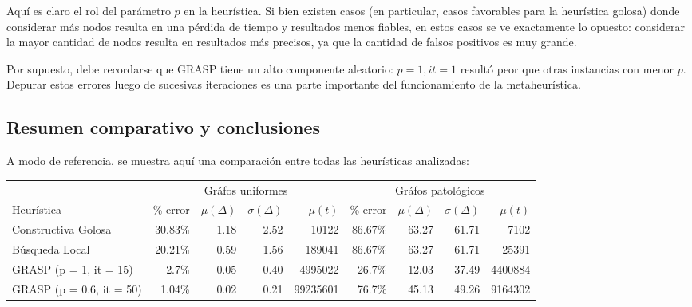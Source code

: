 Aquí es claro el rol del parámetro $p$ en la heurística. Si bien existen casos (en particular, casos favorables para la heurística golosa) donde considerar más nodos resulta en una pérdida de tiempo y resultados menos fiables, en estos casos se ve exactamente lo opuesto: considerar la mayor cantidad de nodos resulta en resultados más precisos, ya que la cantidad de falsos positivos es muy grande.

Por supuesto, debe recordarse que GRASP tiene un alto componente aleatorio: $p = 1, it = 1$ resultó peor que otras instancias con menor $p$. Depurar estos errores luego de sucesivas iteraciones es una parte importante del funcionamiento de la metaheurística.

\subsection{Resumen comparativo y conclusiones}

A modo de referencia, se muestra aquí una comparación entre todas las heurísticas analizadas:

\begin{center}
    \begin{tabular}{| l | r | r | r | r | r | r | r | r |}
        \hline
                                 & \multicolumn{4}{|c|}{Gráfos uniformes}                            & \multicolumn{4}{|c|}{Gráfos patológicos}    \\ \cline{2-9}
        Heurística               & \% error & $\mu(\Delta)$ & $\sigma(\Delta)$ & $\mu(t)$ & \% error & $\mu(\Delta)$ & $\sigma(\Delta)$ & $\mu(t)$ \\ \hline
        Constructiva Golosa      &  30.83\% &          1.18 &             2.52 &    10122 &  86.67\% &         63.27 &            61.71 &     7102 \\ \hline
        Búsqueda Local           &  20.21\% &          0.59 &             1.56 &   189041 &  86.67\% &         63.27 &            61.71 &    25391 \\ \hline
        GRASP (p = 1, it = 15)   &    2.7\% &          0.05 &             0.40 &  4995022 &   26.7\% &         12.03 &            37.49 &  4400884 \\ \hline
        GRASP (p = 0.6, it = 50) &   1.04\% &          0.02 &             0.21 & 99235601 &   76.7\% &         45.13 &            49.26 &  9164302 \\
        \hline
    \end{tabular}
\end{center}

